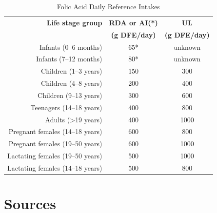 \documentclass{book}
\begin{document}
\begin{sloppypar}
\begin{table}[ht]
	\caption{Folic Acid Daily Reference Intakes}
	\centering \begin{tabular}{| r | c | c |}
		\hline
		\textbf{Life stage group}			& \textbf{RDA or AI(*)}			& \textbf{UL}					\\
											& \textbf{(\textmu g DFE/day)}	& \textbf{(\textmu g DFE/day)}	\\ \hline
		Infants (0--6 months)				& 65*							& unknown						\\ \hline
		Infants (7--12 months)				& 80*							& unknown						\\ \hline
		Children (1--3 years)				& 150							& 300							\\ \hline
		Children (4--8 years)				& 200							& 400							\\ \hline
		Children (9--13 years)				& 300							& 600							\\ \hline
		Teenagers (14--18 years)			& 400							& 800							\\ \hline
		Adults (\textgreater19 years)		& 400							& 1000							\\ \hline
		Pregnant females (14--18 years)		& 600							& 800							\\ \hline
		Pregnant females (19--50 years)		& 600							& 1000							\\ \hline
		Lactating females (19--50 years)	& 500							& 1000							\\ \hline
		Lactating females (14--18 years)	& 500							& 800							\\ \hline
	\end{tabular}
\end{table}
\newpage

\section{Sources}



\end{sloppypar}
\end{document}
